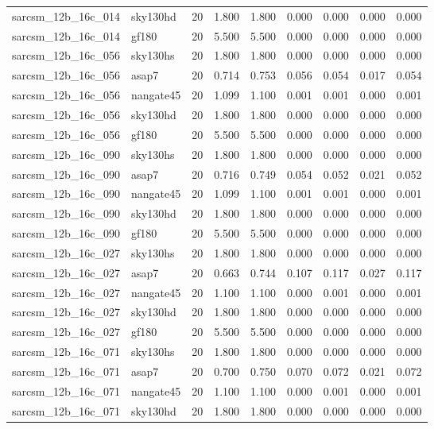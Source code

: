 \begin{tabular}{llrrrrrrr}
sarcsm\_12b\_16c\_014 & sky130hd & 20 & 1.800 & 1.800 & 0.000 & 0.000 & 0.000 & 0.000 \\
sarcsm\_12b\_16c\_014 & gf180 & 20 & 5.500 & 5.500 & 0.000 & 0.000 & 0.000 & 0.000 \\
sarcsm\_12b\_16c\_056 & sky130hs & 20 & 1.800 & 1.800 & 0.000 & 0.000 & 0.000 & 0.000 \\
sarcsm\_12b\_16c\_056 & asap7 & 20 & 0.714 & 0.753 & 0.056 & 0.054 & 0.017 & 0.054 \\
sarcsm\_12b\_16c\_056 & nangate45 & 20 & 1.099 & 1.100 & 0.001 & 0.001 & 0.000 & 0.001 \\
sarcsm\_12b\_16c\_056 & sky130hd & 20 & 1.800 & 1.800 & 0.000 & 0.000 & 0.000 & 0.000 \\
sarcsm\_12b\_16c\_056 & gf180 & 20 & 5.500 & 5.500 & 0.000 & 0.000 & 0.000 & 0.000 \\
sarcsm\_12b\_16c\_090 & sky130hs & 20 & 1.800 & 1.800 & 0.000 & 0.000 & 0.000 & 0.000 \\
sarcsm\_12b\_16c\_090 & asap7 & 20 & 0.716 & 0.749 & 0.054 & 0.052 & 0.021 & 0.052 \\
sarcsm\_12b\_16c\_090 & nangate45 & 20 & 1.099 & 1.100 & 0.001 & 0.001 & 0.000 & 0.001 \\
sarcsm\_12b\_16c\_090 & sky130hd & 20 & 1.800 & 1.800 & 0.000 & 0.000 & 0.000 & 0.000 \\
sarcsm\_12b\_16c\_090 & gf180 & 20 & 5.500 & 5.500 & 0.000 & 0.000 & 0.000 & 0.000 \\
sarcsm\_12b\_16c\_027 & sky130hs & 20 & 1.800 & 1.800 & 0.000 & 0.000 & 0.000 & 0.000 \\
sarcsm\_12b\_16c\_027 & asap7 & 20 & 0.663 & 0.744 & 0.107 & 0.117 & 0.027 & 0.117 \\
sarcsm\_12b\_16c\_027 & nangate45 & 20 & 1.100 & 1.100 & 0.000 & 0.001 & 0.000 & 0.001 \\
sarcsm\_12b\_16c\_027 & sky130hd & 20 & 1.800 & 1.800 & 0.000 & 0.000 & 0.000 & 0.000 \\
sarcsm\_12b\_16c\_027 & gf180 & 20 & 5.500 & 5.500 & 0.000 & 0.000 & 0.000 & 0.000 \\
sarcsm\_12b\_16c\_071 & sky130hs & 20 & 1.800 & 1.800 & 0.000 & 0.000 & 0.000 & 0.000 \\
sarcsm\_12b\_16c\_071 & asap7 & 20 & 0.700 & 0.750 & 0.070 & 0.072 & 0.021 & 0.072 \\
sarcsm\_12b\_16c\_071 & nangate45 & 20 & 1.100 & 1.100 & 0.000 & 0.001 & 0.000 & 0.001 \\
sarcsm\_12b\_16c\_071 & sky130hd & 20 & 1.800 & 1.800 & 0.000 & 0.000 & 0.000 & 0.000 \\

\end{tabular}

